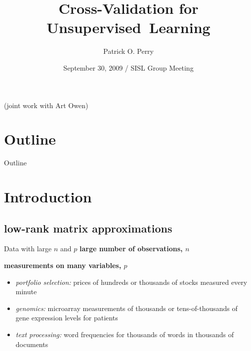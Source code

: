 \documentclass{beamer}
\title{Cross-Validation for Unsupervised~Learning}
\author[P. O. Perry]{Patrick O. Perry}
\institute[Harvard University] 
{
  Statistics and Information Sciences Laboratory\\
  Harvard University
}
\date[SISL Group Meeting]
{September 30, 2009 / SISL Group Meeting}
\begin{document}
\begin{frame}
  \titlepage
  \hfill\small{(joint work with Art Owen)}
\end{frame}

\section*{Outline}
\begin{frame}{Outline}
  \tableofcontents
\end{frame}


\section{Introduction}

\subsection{low-rank matrix approximations}
\begin{frame}{Data with large $n$ and $p$}
  \textbf{large number of observations, $n$}

  \textbf{measurements on many variables, $p$} 

  \begin{itemize}
  \item \textit{portfolio selection:} prices of hundreds or thousands of stocks measured every minute 
  \item \textit{genomics:} microarray measurements of thousands or tens-of-thousands of gene expression levels for patients
  \item \textit{text processing:} word frequencies for thousands of words in thousands of documents
  \end{itemize}
\end{frame}

\end{document}

